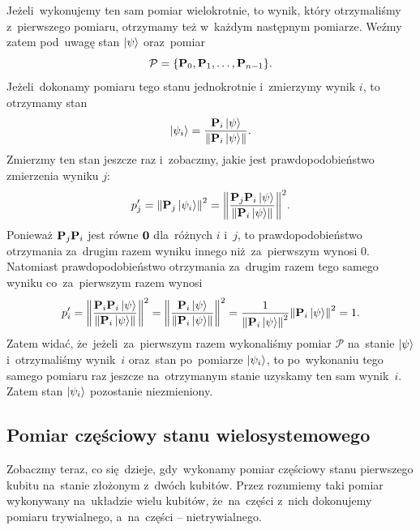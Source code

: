 Jeżeli~wykonujemy ten sam pomiar wielokrotnie, to wynik, który otrzymaliśmy
z~pierwszego pomiaru, otrzymamy też w~każdym następnym pomiarze. Weźmy zatem
pod~uwagę stan $\ket{\psi}$
oraz~pomiar
$$\mathcal{P}=\{\mathbf{P}_0,\mathbf{P}_1, \ldots, \mathbf{P}_{n-1}\}.$$
Jeżeli~dokonamy
pomiaru tego stanu jednokrotnie i~zmierzymy wynik $i$, to otrzymamy stan
$$
	\ket{\psi_i} = \frac{\mathbf{P}_i\ket{\psi}}{\norm{\mathbf{P}_i\ket{\psi}}}.
$$
Zmierzmy ten stan jeszcze raz i~zobaczmy, jakie jest prawdopodobieństwo zmierzenia wyniku $j$:
$$
	p_j'=\norm{\mathbf{P}_j\ket{\psi_i}}^2 = \norm{\frac{\mathbf{P}_j\mathbf{P}_i\ket{\psi}}{\norm{\mathbf{P}_i\ket{\psi}}}}^2.
$$
Ponieważ $\mathbf{P}_j \mathbf{P}_i$ jest równe $\mathbf{0}$ dla~różnych $i$ i~$j$, to prawdopodobieństwo
otrzymania za~drugim razem wyniku innego niż~za~pierwszym wynosi 0.
Natomiast prawdopodobieństwo otrzymania za~drugim razem tego samego wyniku co~za~pierwszym razem wynosi
$$
	p_i'=\norm{\frac{\mathbf{P}_i\mathbf{P}_i\ket{\psi}}{\norm{\mathbf{P}_i\ket{\psi}}}}^2 = \norm{\frac{\mathbf{P}_i\ket{\psi}}{\norm{\mathbf{P}_i\ket{\psi}}}}^2 =
	\frac{1}{\norm{\mathbf{P}_i\ket{\psi}}^2} \norm{\mathbf{P}_i\ket{\psi}}^2 = 1.
$$
Zatem widać, że~jeżeli~za~pierwszym razem wykonaliśmy pomiar
$\mathcal{P}$ na~stanie $\ket{\psi}$ i~otrzymaliśmy wynik~$i$ oraz~stan
po~pomiarze $\ket{\psi_i}$, to po~wykonaniu tego samego pomiaru raz
jeszcze na~otrzymanym stanie uzyskamy ten sam wynik~$i$. Zatem stan
$\ket{\psi_i}$ pozostanie niezmieniony.

\subsection{Pomiar częściowy stanu wielosystemowego}
Zobaczmy teraz, co się~dzieje, gdy~wykonamy pomiar częściowy stanu pierwszego
kubitu na~stanie złożonym z~dwóch kubitów. Przez  rozumiemy taki pomiar wykonywany na~układzie
wielu kubitów, że~na~części z~nich dokonujemy pomiaru trywialnego, a~na~części --
nietrywialnego.

